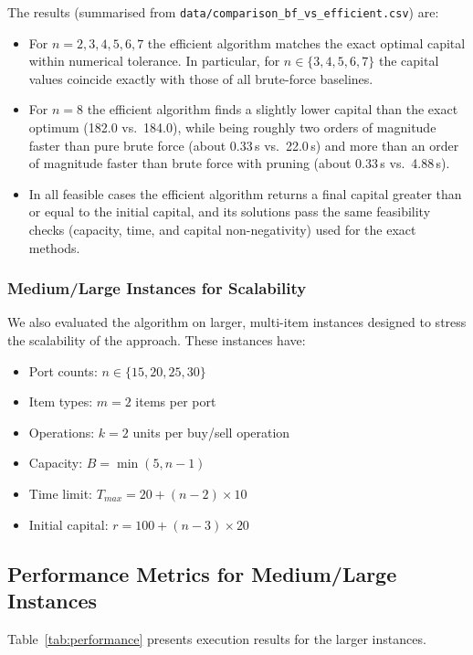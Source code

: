 \documentclass[12pt]{article}
\begin{document}
The results (summarised from \texttt{data/comparison\_bf\_vs\_efficient.csv}) are:
\begin{itemize}
    \item For $n = 2,3,4,5,6,7$ the efficient algorithm matches the exact optimal capital within numerical tolerance. In particular, for $n \in \{3,4,5,6,7\}$ the capital values coincide exactly with those of all brute-force baselines.
    \item For $n = 8$ the efficient algorithm finds a slightly lower capital than the exact optimum (182.0 vs.\ 184.0), while being roughly two orders of magnitude faster than pure brute force (about 0.33\,s vs.\ 22.0\,s) and more than an order of magnitude faster than brute force with pruning (about 0.33\,s vs.\ 4.88\,s).
    \item In all feasible cases the efficient algorithm returns a final capital greater than or equal to the initial capital, and its solutions pass the same feasibility checks (capacity, time, and capital non-negativity) used for the exact methods.
\end{itemize}

\subsubsection{Medium/Large Instances for Scalability}

We also evaluated the algorithm on larger, multi-item instances designed to stress the scalability of the approach. These instances have:
\begin{itemize}
    \item Port counts: $n \in \{15, 20, 25, 30\}$
    \item Item types: $m = 2$ items per port
    \item Operations: $k = 2$ units per buy/sell operation
    \item Capacity: $B = \min(5, n-1)$
    \item Time limit: $T_{max} = 20 + (n-2) \times 10$
    \item Initial capital: $r = 100 + (n-3) \times 20$
\end{itemize}

\subsection{Performance Metrics for Medium/Large Instances}

Table~\ref{tab:performance} presents execution results for the larger instances.
\end{document}
